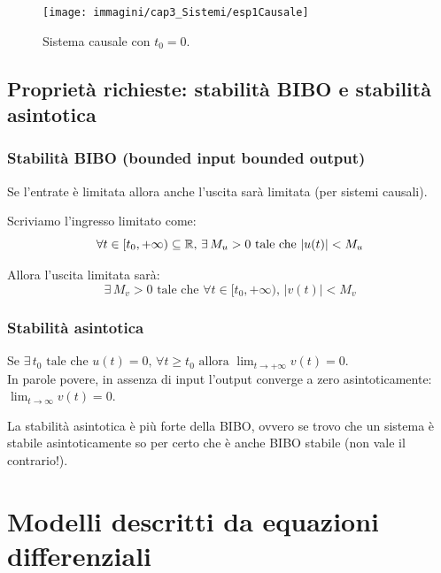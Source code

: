 			\begin{figure}[H]
				\centering
				\texttt{[image: immagini/cap3\_Sistemi/esp1Causale]}
				\caption{ Sistema causale con $ t_0 = 0$. }
				\label{fig: esp1Causale}
			\end{figure}
	
	\subsection{Proprietà richieste: stabilità BIBO e stabilità asintotica}

		\subsubsection{Stabilità BIBO (bounded input bounded output)}\label{sist_prop_BIBOstab}
			
			Se l'entrate è limitata allora anche l'uscita sarà limitata (per sistemi causali).
			
			Scriviamo l'ingresso limitato come:
			\[
				\forall t \in [t_0, + \infty) \subseteq \mathbb{R}\text{, } \exists \, M_u >0 \text{ tale che } \lvert u(t) \rvert < M_u	
			\]
			
			Allora l'uscita limitata sarà:
				\[
			\exists \, M_v > 0 \text{ tale che } \forall t \in [t_0, + \infty) \text{, } \lvert v(t) \rvert < M_v
			\]
			
		\subsubsection{Stabilità asintotica}


			Se $\exists \, t_0 \text{ tale che } u(t)=0 \text{, } \forall t \ge t_0 \text{ allora } \lim_{t \to +\infty} v(t)=0$.\\
			In parole povere, in assenza di input l'output converge a zero asintoticamente: $\lim_{t \to \infty} v(t)=0$.
			
			\begin{NB}				
			La stabilità asintotica è più forte della BIBO, ovvero se trovo che un sistema è stabile asintoticamente so per certo che è anche BIBO stabile (non vale il contrario!).
			\end{NB}

	
\section{Modelli descritti da equazioni differenziali}


